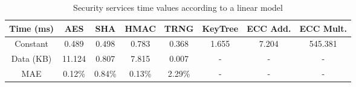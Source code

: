 \begin{table}[h!]
\centering
\def\arraystretch{1.5}
\begin{tabular}{|c|c|c|c|c|c|c|c|}
\hline
Time (ms) & AES    & SHA    & HMAC   & TRNG   & KeyTree & ECC Add. & ECC Mult.   \\ \hline
Constant  & 0.489  & 0.498 & 0.783  & 0.368  & 1.655   & 7.204 & 545.381 \\ \hline
Data (KB) & 11.124 & 0.807  & 7.815  & 0.007  & -       & -  & - \\ \hline
MAE       & 0.12\% & 0.84\% & 0.13\% & 2.29\% & -       & -  & - \\ \hline
\end{tabular}
\caption{Security services time values according to a linear model}
\label{tab:core-model}
\end{table}
